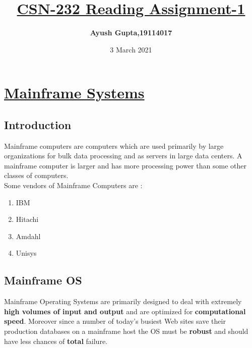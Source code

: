 \documentclass{article}
\title{\textbf{\underline{CSN-232 Reading Assignment-1}}}
\author{
\textbf{Ayush Gupta,19114017} \\
}
\date{3 March 2021}
\begin{document}
\maketitle
\tableofcontents

\section{\underline{Mainframe Systems}}
      \subsection{Introduction}
      Mainframe computers are computers which are used primarily by large organizations for bulk data processing and as servers in large data centers. A mainframe computer is larger and has more processing power than some other classes of computers. \\
      Some vendors of Mainframe Computers are :
      \begin{enumerate}
          \item IBM
          \item Hitachi
          \item Amdahl
          \item Unisys
      \end{enumerate}
      \subsection{Mainframe OS}
      Mainframe Operating Systems are primarily designed to deal with extremely \textbf{high volumes of input and output} and are optimized for \textbf{computational speed}. Moreover since a number of today’s busiest Web sites save their production databases on a mainframe host the OS must be \textbf{robust} and should have less chances of \textbf{total} failure.
\end{document}
